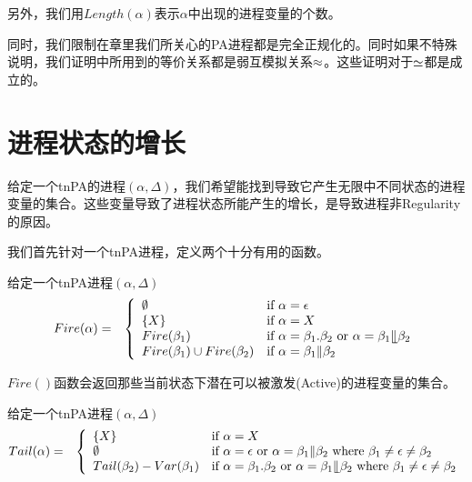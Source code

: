 另外，我们用$Length(\alpha)$表示$\alpha$中出现的进程变量的个数。

同时，我们限制在章里我们所关心的PA进程都是完全正规化的。同时如果不特殊说明，我们证明中所用到的等价关系都是弱互模拟关系$\approx$。这些证明对于$\simeq$都是成立的。

\section{进程状态的增长}
\label{sec:grow-prop}

给定一个tnPA的进程$(\alpha,\Delta)$，我们希望能找到导致它产生无限中不同状态的进程变量的集合。这些变量导致了进程状态所能产生的增长，是导致进程非Regularity的原因。

我们首先针对一个tnPA进程，定义两个十分有用的函数。

\begin{defn}[Fire 函数]\label{def:fire}
给定一个tnPA进程$(\alpha,\Delta)$
\begin{eqnarray*}
Fire(\alpha) &=& \left\{ \begin{array}{ll}
\emptyset & \mbox{if }\alpha=\epsilon\\
\{X\} & \mbox{if }\alpha=X\\
Fire(\beta_1) & \mbox{if }\alpha=\beta_1.\beta_2\mbox{ or }\alpha=\beta_1\llfloor\beta_2\\
Fire(\beta_1)\cup Fire(\beta_2) & \mbox{if }\alpha=\beta_1\|\beta_2
\end{array}\right.
\end{eqnarray*}
\end{defn}

$Fire()$函数会返回那些当前状态下潜在可以被激发(Active)的进程变量的集合。

\begin{defn}[Tail 函数]\label{def:tail}
给定一个tnPA进程$(\alpha,\Delta)$
\begin{eqnarray*}
Tail(\alpha) &=& \left\{ \begin{array}{ll}
\{X\} & \mbox{if }\alpha=X\\
\emptyset & \mbox{if }\alpha=\epsilon \mbox{ or } \alpha=\beta_1\|\beta_2 \mbox{ where } \beta_1\neq\epsilon\neq\beta_2\\
Tail(\beta_2)-Var(\beta_1) &\mbox{if }\alpha=\beta_1.\beta_2 \mbox{ or }\alpha=\beta_1\llfloor\beta_2\mbox{ where }\beta_1\neq\epsilon\neq\beta_2
\end{array}\right.
\end{eqnarray*}
\end{defn}

